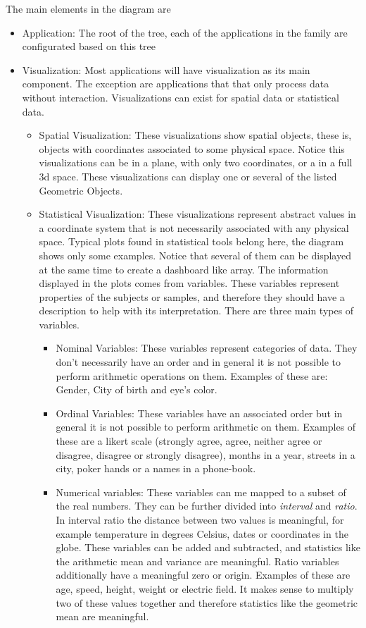 \begin{figure}
\caption{\label{fig_feature_problem}}
\end{figure}

The main elements in the diagram are

\begin{itemize}
\item Application: The root of the tree, each of the applications in the family are configurated based on this tree
\item Visualization: Most applications will have visualization as its main component. The exception are applications that that only process data without interaction. Visualizations can exist for spatial data or statistical data.
\begin{itemize}
\item Spatial Visualization: These visualizations show spatial objects, these is, objects with coordinates associated to some physical space. Notice this visualizations can be in a plane, with only two coordinates, or a in a full 3d space. These visualizations can display one or several of the listed Geometric Objects.
\item Statistical Visualization: These visualizations represent abstract values in a coordinate system that is not necessarily associated with any physical space. Typical plots found in statistical tools belong here, the diagram shows only some examples. Notice that several of them can be displayed at the same time to create a dashboard like array. The information displayed in the plots comes from variables. These variables represent properties of the subjects or samples, and therefore they should have a description to help with its interpretation. There are three main types of variables.
\begin{itemize}
\item Nominal Variables: These variables represent categories of data. They don't necessarily have an order and in general it is not possible to perform arithmetic operations on them. Examples of these are: Gender, City of birth and eye's color.
\item Ordinal Variables: These variables have an associated order but in general it is not possible to perform arithmetic on them. Examples of these are a likert scale (strongly agree, agree, neither agree or disagree, disagree or strongly disagree), months in a year, streets in a city, poker hands or a names in a phone-book.
\item Numerical variables: These variables can me mapped to a subset of the real numbers. They can be further divided into \emph{interval} and  \emph{ratio}. In interval ratio the distance between two values is meaningful, for example temperature in degrees Celsius, dates or coordinates in the globe. These variables can be added and subtracted, and statistics like the arithmetic mean and variance are meaningful. Ratio variables additionally have a meaningful zero or origin. Examples of these are age, speed, height, weight or electric field. It makes sense to multiply two of these values together and therefore statistics like the geometric mean are meaningful.

\end{itemize}
\end{itemize}
\end{itemize}
